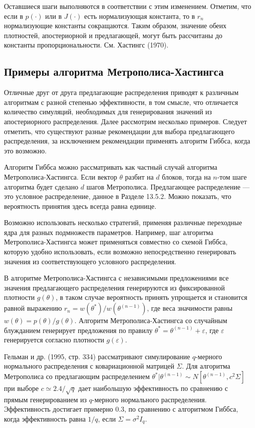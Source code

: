 Оставшиеся шаги выполняются в соответствии с этим изменением. Отметим, что если в $p(\cdot)$ или в $J(\cdot)$ есть нормализующая константа, то в $r_n$ нормализующие константы сокращаются. Таким образом, значение обеих плотностей, апостериорной и предлагающей, могут быть рассчитаны до  константы пропорциональности. См. Хастингс (1970).

\subsection{Примеры алгоритма Метрополиса-Хастингса}

Отличные друг от друга предлагающие распределения приводят к различным алгоритмам с разной степенью эффективности, в том смысле, что отличается количество симуляций, необходимых для генерирования значений из апостериорного распределения. Далее рассмотрим несколько примеров. Следует отметить, что существуют разные рекомендации  для выбора предлагающего распределения, за исключением рекомендации применять алгоритм Гиббса, когда это возможно.  

Алгоритм Гиббса можно рассматривать как частный случай алгоритма Метрополиса-Хастингса. Если вектор $\theta$ разбит на $d$ блоков, тогда на $n$-том шаге алгоритма будет сделано $d$ шагов Метрополиса. Предлагающее распределение --- это  условное распределение, данное  в Разделе 13.5.2. Можно показать, что вероятность принятия здесь всегда равна единице. %

Возможно использовать несколько стратегий, применяя различные переходные ядра  для разных подмножеств параметров. Например, шаг алгоритма Метрополиса-Хастингса может применяться совместно со схемой Гиббса, которую удобно использовать, если возможно непосредственно генерировать значения из соответствующего условного распределения.

В алгоритме Метрополиса-Хастингса с независимыми предложениями все значения предлагающего распределения генерируются  из фиксированной плотности $g(\theta)$, в таком случае вероятность принять упрощается и становится равной выражению $r_n=w(\theta^{*})/w(\theta^{(n-1)})$, где веса значимости равны $w(\theta)=p(\theta)/g(\theta)$. Алгоритм Метрополиса-Хастингса со случайным блужданием генерирует предложения по правилу $\theta^*=\theta^{(n-1)}+\varepsilon$, где $\varepsilon$ генерируется согласно плотности $g(\varepsilon)$.

Гельман и др. (1995, стр. 334) рассматривают симулирование $q$-мерного нормального распределения с ковариационной матрицей $\Sigma$. Для алгоритма Метрополиса со предлагающим  распределением $\theta^{*}|\theta^{(n-1)}{\sim}N[\theta^{(n-1)},c^{2}\Sigma]$ при выборе $c{\simeq}2.4/\sqrt{q}$ дает наибольшую эффективность по сравнению с прямым генерированием из $q$-мерного нормального распределения. Эффективность достигает примерно $0.3$, по сравнению с алгоритмом Гиббса, когда эффективность равна $1/q$, если $\Sigma=\sigma^{2}I_q$.

